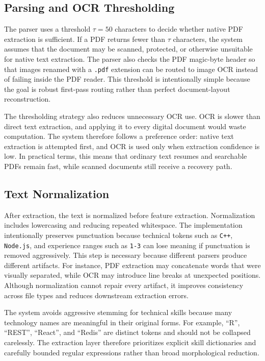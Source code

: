 \documentclass[conference]{IEEEtran}
\begin{document}
\subsection{Parsing and OCR Thresholding}
The parser uses a threshold \(\tau=50\) characters to decide whether native PDF extraction is sufficient. If a PDF returns fewer than \(\tau\) characters, the system assumes that the document may be scanned, protected, or otherwise unsuitable for native text extraction. The parser also checks the PDF magic-byte header so that images renamed with a \texttt{.pdf} extension can be routed to image OCR instead of failing inside the PDF reader. This threshold is intentionally simple because the goal is robust first-pass routing rather than perfect document-layout reconstruction.

The thresholding strategy also reduces unnecessary OCR use. OCR is slower than direct text extraction, and applying it to every digital document would waste computation. The system therefore follows a preference order: native text extraction is attempted first, and OCR is used only when extraction confidence is low. In practical terms, this means that ordinary text resumes and searchable PDFs remain fast, while scanned documents still receive a recovery path.

\subsection{Text Normalization}
After extraction, the text is normalized before feature extraction. Normalization includes lowercasing and reducing repeated whitespace. The implementation intentionally preserves punctuation because technical tokens such as \texttt{C++}, \texttt{Node.js}, and experience ranges such as \texttt{1-3} can lose meaning if punctuation is removed aggressively. This step is necessary because different parsers produce different artifacts. For instance, PDF extraction may concatenate words that were visually separated, while OCR may introduce line breaks at unexpected positions. Although normalization cannot repair every artifact, it improves consistency across file types and reduces downstream extraction errors.

The system avoids aggressive stemming for technical skills because many technology names are meaningful in their original forms. For example, ``R'', ``REST'', ``React'', and ``Redis'' are distinct tokens and should not be collapsed carelessly. The extraction layer therefore prioritizes explicit skill dictionaries and carefully bounded regular expressions rather than broad morphological reduction.
\end{document}
